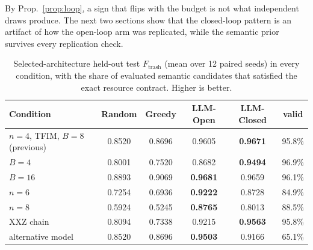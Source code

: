 \documentclass[11pt]{article}
\begin{document}
By Prop.~\ref{prop:loop}, a sign that flips with the budget is not what independent
draws produce. The next two sections show that the closed-loop pattern is an artifact
of how the open-loop arm was replicated, while the semantic prior survives every
replication check.

\begin{table}[t]
\centering\small
\caption{Selected-architecture held-out test $F_{\mathrm{trash}}$ (mean over 12
paired seeds) in every condition, with the share of evaluated semantic
candidates that satisfied the exact resource contract. Higher is better.}
\label{tab:robustness-means}
\begin{tabular}{lccccc}
\toprule
Condition & Random & Greedy & LLM-Open & LLM-Closed & valid \\
\midrule
$n{=}4$, TFIM, $B{=}8$ (previous) & 0.8520 & 0.8696 & 0.9605 & \textbf{0.9671} & 95.8\% \\
$B{=}4$ & 0.8001 & 0.7520 & 0.8682 & \textbf{0.9494} & 96.9\% \\
$B{=}16$ & 0.8893 & 0.9069 & \textbf{0.9681} & 0.9659 & 96.1\% \\
$n{=}6$ & 0.7254 & 0.6936 & \textbf{0.9222} & 0.8728 & 84.9\% \\
$n{=}8$ & 0.5924 & 0.5245 & \textbf{0.8765} & 0.8013 & 88.5\% \\
XXZ chain & 0.8094 & 0.7338 & 0.9215 & \textbf{0.9563} & 95.8\% \\
alternative model & 0.8520 & 0.8696 & \textbf{0.9503} & 0.9166 & 65.1\% \\
\bottomrule
\end{tabular}
\end{table}
\end{document}
